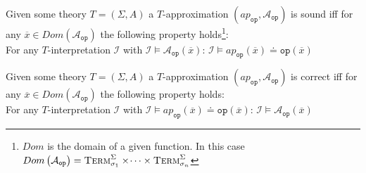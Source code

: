 \begin{definition}
Given some theory $T=\left(\Sigma,A\right)$ a $T$-approximation $\left(ap_{\texttt{op}}, \mathcal{A}_{\texttt{op}}\right)$ is sound iff for any $\overline{x}\in Dom\left(\mathcal{A}_{\texttt{op}}\right)$ the following property holds\footnote{$Dom$ is the domain of a given function. In this case $Dom\left(\mathcal{A}_{\texttt{op}}\right) = \textsc{Term}^\Sigma_{\sigma_1}\times\dotsi\times\textsc{Term}^\Sigma_{\sigma_n}$}:\\
For any $T$-interpretation $\mathcal{I}$ with $\mathcal{I}\vDash\mathcal{A}_{\texttt{op}}\left(\overline{x}\right)$:
$\mathcal{I}\vDash ap_{\texttt{op}}\left(\overline{x}\right) \doteq \texttt{op}\left(\overline{x}\right)$
\end{definition}

\begin{definition}
Given some theory $T=\left(\Sigma,A\right)$ a $T$-approximation $\left(ap_{\texttt{op}}, \mathcal{A}_{\texttt{op}}\right)$ is correct iff for any $\overline{x}\in Dom\left(\mathcal{A}_{\texttt{op}}\right)$ the following property holds:\\
For any $T$-interpretation $\mathcal{I}$ with $\mathcal{I}\vDash ap_{\texttt{op}}\left(\overline{x}\right) \doteq \texttt{op}\left(\overline{x}\right)$:
$\mathcal{I}\vDash\mathcal{A}_{\texttt{op}}\left(\overline{x}\right)$
\end{definition}

